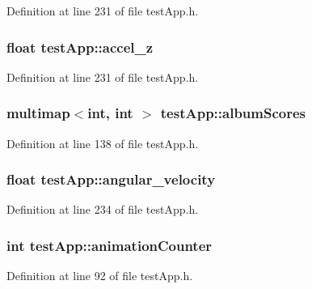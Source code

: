 Definition at line 231 of file test\-App.\-h.

\hypertarget{classtest_app_a61dbdd5c0b868568dde40a52f6e56054}{
\subsubsection[{accel\-\_\-z}]{\setlength{\rightskip}{0pt plus 5cm}float test\-App\-::accel\-\_\-z}}\label{classtest_app_a61dbdd5c0b868568dde40a52f6e56054}


Definition at line 231 of file test\-App.\-h.

\hypertarget{classtest_app_aa16e3bba73f9adb3c6363ac429e5a472}{
\subsubsection[{album\-Scores}]{\setlength{\rightskip}{0pt plus 5cm}multimap$<$int, int $>$ test\-App\-::album\-Scores}}\label{classtest_app_aa16e3bba73f9adb3c6363ac429e5a472}


Definition at line 138 of file test\-App.\-h.

\hypertarget{classtest_app_a98e05c3206ff95fccfebfc9df5317598}{
\subsubsection[{angular\-\_\-velocity}]{\setlength{\rightskip}{0pt plus 5cm}float test\-App\-::angular\-\_\-velocity}}\label{classtest_app_a98e05c3206ff95fccfebfc9df5317598}


Definition at line 234 of file test\-App.\-h.

\hypertarget{classtest_app_a21b16bdba744425519597fcb925df43a}{
\subsubsection[{animation\-Counter}]{\setlength{\rightskip}{0pt plus 5cm}int test\-App\-::animation\-Counter}}\label{classtest_app_a21b16bdba744425519597fcb925df43a}


Definition at line 92 of file test\-App.\-h.

